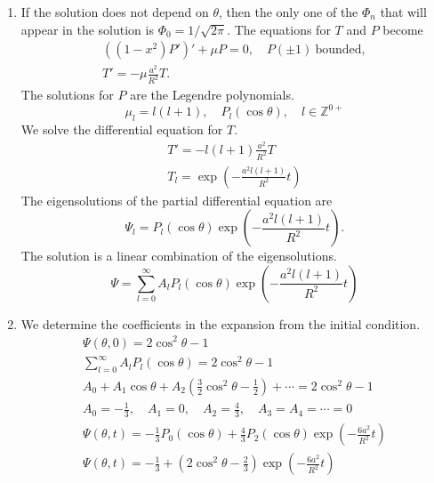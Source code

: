 {\begin{Solution}
\begin{enumerate}
    $P(x)$ should be bounded at the endpoints, $x = -1$ and $x = 1$.
  \item
    If the solution does not depend on $\theta$, then the only one of 
    the $\Phi_n$ that will appear in the solution is 
    $\Phi_0 = 1 / \sqrt{2 \pi}$.  The equations for $T$ and $P$ 
    become
    \begin{gather*}
      \left( \left( 1 - x^2 \right) P' \right)' + \mu P = 0,\quad
      P(\pm 1)\ \mathrm{bounded}, \\
      T' = - \mu \frac{a^2}{R^2} T.
    \end{gather*}
    The solutions for $P$ are the Legendre polynomials.
    \[
    \mu_l = l(l+1), \quad P_l(\cos \theta), \quad l \in \mathbb{Z}^{0+}
    \]
    We solve the differential equation for $T$.
    \begin{gather*}
      T' = - l(l+1) \frac{a^2}{R^2} T \\
      T_l = \exp \left( - \frac{a^2 l(l+1)}{R^2} t \right)
    \end{gather*}
    The eigensolutions of the partial differential equation are
    \[
    \Psi_l = P_l(\cos \theta) \exp \left( - \frac{a^2 l(l+1)}{R^2} t \right).
    \]
    The solution is a linear combination of the eigensolutions.
    \[
    \Psi = \sum_{l=0}^\infty A_l P_l(\cos \theta) 
    \exp \left( - \frac{a^2 l(l+1)}{R^2} t \right)
    \]
  \item
    We determine the coefficients in the expansion from the initial 
    condition.
    \begin{gather*}
      \Psi(\theta,0) = 2 \cos^2 \theta - 1 \\
      \sum_{l=0}^\infty A_l P_l(\cos \theta) = 2 \cos^2 \theta - 1 \\
      A_0 + A_1 \cos \theta 
      + A_2 \left( \frac{3}{2} \cos^2 \theta - \frac{1}{2} \right)
      + \cdots = 2 \cos^2 \theta - 1 \\
      A_0 = - \frac{1}{3}, \quad A_1 = 0, \quad
      A_2 = \frac{4}{3}, \quad A_3 = A_4 = \cdots = 0 \\
      \Psi(\theta,t) = - \frac{1}{3} P_0(\cos \theta) 
      + \frac{4}{3} P_2(\cos \theta) 
      \exp \left( - \frac{6 a^2}{R^2} t \right) \\
      \boxed{
        \Psi(\theta,t) = - \frac{1}{3}
        + \left( 2 \cos^2 \theta - \frac{2}{3} \right)
        \exp \left( - \frac{6 a^2}{R^2} t \right)
        }
    \end{gather*}
  \end{enumerate}
\end{Solution}












}
